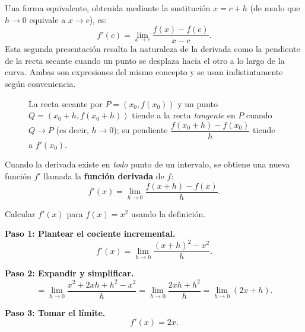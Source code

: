 Una forma equivalente, obtenida mediante la sustitución $x = c+h$
(de modo que $h\to 0$ equivale a $x\to c$), es:
\[
f'(c) = \lim_{x \to c} \frac{f(x)-f(c)}{x-c}.
\]
Esta segunda presentación resalta la naturaleza de la derivada como la
pendiente de la recta secante cuando un punto se desplaza hacia el otro
a lo largo de la curva. Ambas son expresiones del mismo concepto y se
usan indistintamente según conveniencia.

\begin{figure}[!htbp]
\centering
{}
\caption{La recta secante por $P=(x_0,f(x_0))$ y un punto
  $Q=(x_0+h,f(x_0+h))$ tiende a la recta \emph{tangente} en $P$ cuando
  $Q\to P$ (es decir, $h\to 0$); su pendiente
  $\dfrac{f(x_0+h)-f(x_0)}{h}$ tiende a $f'(x_0)$.}
\label{fig:secante_tangente}
\end{figure}

Cuando la derivada existe en \emph{todo} punto de un intervalo, se obtiene
una nueva función $f'$ llamada la \textbf{función derivada} de $f$:
\[
f'(x) = \lim_{h \to 0} \frac{f(x+h)-f(x)}{h}.
\]

\begin{example}
Calcular $f'(x)$ para $f(x) = x^2$ usando la definición.

\begin{myproof}

\textbf{Paso 1: Plantear el cociente incremental.}
\[
f'(x) = \lim_{h\to 0}\frac{(x+h)^2 - x^2}{h}.
\]

\textbf{Paso 2: Expandir y simplificar.}
\[
= \lim_{h\to 0}\frac{x^2+2xh+h^2-x^2}{h}
= \lim_{h\to 0}\frac{2xh+h^2}{h}
= \lim_{h\to 0}(2x+h).
\]

\textbf{Paso 3: Tomar el límite.}
\[
\boxed{f'(x) = 2x.}
\]
\end{myproof}
\end{example}


